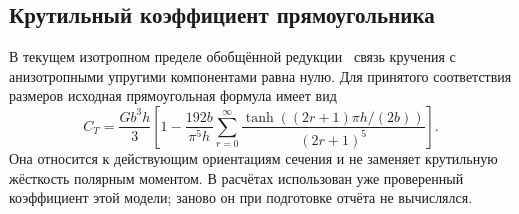 \documentclass[11pt,a4paper]{article}
\begin{document}
\subsection*{Крутильный коэффициент прямоугольника}
В текущем изотропном пределе обобщённой редукции~\cite{yartsev} связь кручения с анизотропными упругими компонентами равна нулю. Для принятого соответствия размеров исходная прямоугольная формула имеет вид
\begin{equation}
C_T=\frac{G b^3h}{3}\left[1-\frac{192b}{\pi^5h}
\sum_{r=0}^{\infty}\frac{\tanh\!\left((2r+1)\pi h/(2b)\right)}{(2r+1)^5}\right].
\label{eq:CT}
\end{equation}
Она относится к действующим ориентациям сечения и не заменяет крутильную жёсткость полярным моментом. В расчётах использован уже проверенный коэффициент этой модели; заново он при подготовке отчёта не вычислялся.
\end{document}
